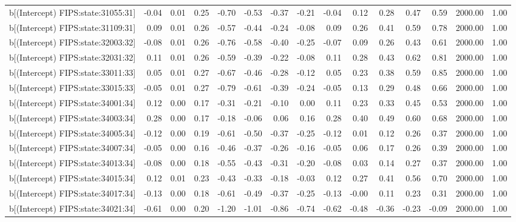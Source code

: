 \begin{table}[ht]
\begin{tabular}{rrrrrrrrrrrrrrr}
  b[(Intercept) FIPS:state:31055:31] & -0.04 & 0.01 & 0.25 & -0.70 & -0.53 & -0.37 & -0.21 & -0.04 & 0.12 & 0.28 & 0.47 & 0.59 & 2000.00 & 1.00 \\ 
  b[(Intercept) FIPS:state:31109:31] & 0.09 & 0.01 & 0.26 & -0.57 & -0.44 & -0.24 & -0.08 & 0.09 & 0.26 & 0.41 & 0.59 & 0.78 & 2000.00 & 1.00 \\ 
  b[(Intercept) FIPS:state:32003:32] & -0.08 & 0.01 & 0.26 & -0.76 & -0.58 & -0.40 & -0.25 & -0.07 & 0.09 & 0.26 & 0.43 & 0.61 & 2000.00 & 1.00 \\ 
  b[(Intercept) FIPS:state:32031:32] & 0.11 & 0.01 & 0.26 & -0.59 & -0.39 & -0.22 & -0.08 & 0.11 & 0.28 & 0.43 & 0.62 & 0.81 & 2000.00 & 1.00 \\ 
  b[(Intercept) FIPS:state:33011:33] & 0.05 & 0.01 & 0.27 & -0.67 & -0.46 & -0.28 & -0.12 & 0.05 & 0.23 & 0.38 & 0.59 & 0.85 & 2000.00 & 1.00 \\ 
  b[(Intercept) FIPS:state:33015:33] & -0.05 & 0.01 & 0.27 & -0.79 & -0.61 & -0.39 & -0.24 & -0.05 & 0.13 & 0.29 & 0.48 & 0.66 & 2000.00 & 1.00 \\ 
  b[(Intercept) FIPS:state:34001:34] & 0.12 & 0.00 & 0.17 & -0.31 & -0.21 & -0.10 & 0.00 & 0.11 & 0.23 & 0.33 & 0.45 & 0.53 & 2000.00 & 1.00 \\ 
  b[(Intercept) FIPS:state:34003:34] & 0.28 & 0.00 & 0.17 & -0.18 & -0.06 & 0.06 & 0.16 & 0.28 & 0.40 & 0.49 & 0.60 & 0.68 & 2000.00 & 1.00 \\ 
  b[(Intercept) FIPS:state:34005:34] & -0.12 & 0.00 & 0.19 & -0.61 & -0.50 & -0.37 & -0.25 & -0.12 & 0.01 & 0.12 & 0.26 & 0.37 & 2000.00 & 1.00 \\ 
  b[(Intercept) FIPS:state:34007:34] & -0.05 & 0.00 & 0.16 & -0.46 & -0.37 & -0.26 & -0.16 & -0.05 & 0.06 & 0.17 & 0.26 & 0.39 & 2000.00 & 1.00 \\ 
  b[(Intercept) FIPS:state:34013:34] & -0.08 & 0.00 & 0.18 & -0.55 & -0.43 & -0.31 & -0.20 & -0.08 & 0.03 & 0.14 & 0.27 & 0.37 & 2000.00 & 1.00 \\ 
  b[(Intercept) FIPS:state:34015:34] & 0.12 & 0.01 & 0.23 & -0.43 & -0.33 & -0.18 & -0.03 & 0.12 & 0.27 & 0.41 & 0.56 & 0.70 & 2000.00 & 1.00 \\ 
  b[(Intercept) FIPS:state:34017:34] & -0.13 & 0.00 & 0.18 & -0.61 & -0.49 & -0.37 & -0.25 & -0.13 & -0.00 & 0.11 & 0.23 & 0.31 & 2000.00 & 1.00 \\ 
  b[(Intercept) FIPS:state:34021:34] & -0.61 & 0.00 & 0.20 & -1.20 & -1.01 & -0.86 & -0.74 & -0.62 & -0.48 & -0.36 & -0.23 & -0.09 & 2000.00 & 1.00 \\ 

\end{tabular}
\end{table}
